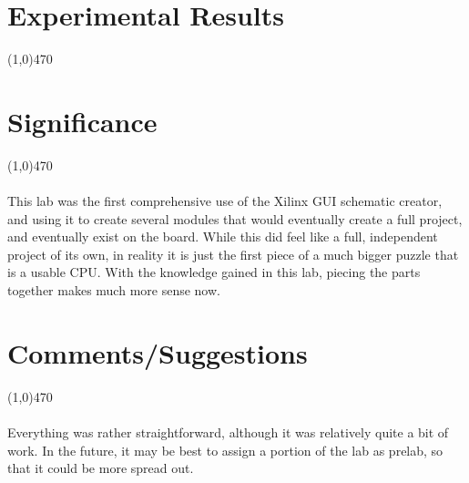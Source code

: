 \documentclass[12pt]{article}
\begin{document}
\section{Experimental Results}\vspace{-.7cm} \line(1,0){470}

%
%
%
%
%

	\newpage
\section{Significance} \vspace{-.7cm} \line(1,0){470}
	\paragraph{}
		This lab was the first comprehensive use of the Xilinx GUI schematic creator, and using it to create several modules that would eventually create a full project, and eventually exist on the board. While this did feel like a full, independent project of its own, in reality it is just the first piece of a much bigger puzzle that is a usable CPU. With the knowledge gained in this lab, piecing the parts together makes much more sense now. 

 \section{Comments/Suggestions}\vspace{-.7cm} \line(1,0){470}
 	\paragraph{}
		Everything was rather straightforward, although it was relatively quite a bit of work. In the future, it may be best to assign a portion of the lab as prelab, so that it could be more spread out.
		
\end{document}
